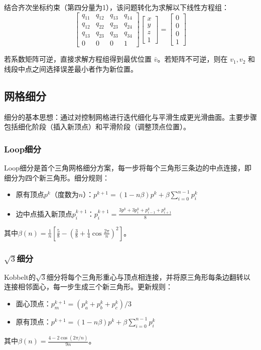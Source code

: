\documentclass[12pt]{article}
\begin{document}
结合齐次坐标约束（第四分量为1），该问题转化为求解以下线性方程组：
\begin{equation}
\begin{bmatrix}
q_{11} & q_{12} & q_{13} & q_{14} \\
q_{12} & q_{22} & q_{23} & q_{24} \\
q_{13} & q_{23} & q_{33} & q_{34} \\
0 & 0 & 0 & 1
\end{bmatrix}
\begin{bmatrix} x \\ y \\ z \\ 1 \end{bmatrix}
=
\begin{bmatrix} 0 \\ 0 \\ 0 \\ 1 \end{bmatrix}
\end{equation}

若系数矩阵可逆，直接求解方程组得到最优位置 $\bar{v}$。若矩阵不可逆，则在 $v_1, v_2$ 和线段中点之间选择误差最小者作为新位置。

\subsection{网格细分}

细分的基本思想：通过对控制网格进行迭代细化与平滑生成更光滑曲面。主要步骤包括细化阶段（插入新顶点）和平滑阶段（调整顶点位置）。

\subsubsection{Loop细分}
Loop细分是首个三角网格细分方案，每一步将每个三角形三条边的中点连接，即细分为四个新三角形。细分规则：
\begin{itemize}
    \item 原有顶点$p^k$（度数为$n$）：$p^{k+1} = (1 - n\beta) p^k + \beta \sum_{i=0}^{n-1} p_i^k$
    \item 边中点插入新顶点$p_i^{k+1}$：$p_i^{k+1} = \frac{3p^k + 3p_i^k + p_{i-1}^k + p_{i+1}^k}{8}$
\end{itemize}
其中$\beta(n) = \frac{1}{n} \left[ \frac{5}{8} - \left( \frac{3}{8} + \frac{1}{4} \cos \frac{2\pi}{n} \right)^2 \right]$。

\subsubsection{$\sqrt{3}$细分}
Kobbelt的$\sqrt{3}$细分将每个三角形重心与顶点相连接，并将原三角形每条边翻转以连接相邻面心，每一步生成三个新三角形。更新规则：
\begin{itemize}
    \item 面心顶点：$p_m^{k+1} = (p_a^k + p_b^k + p_c^k)/3$
    \item 原有顶点：$p^{k+1} = (1 - n\beta) p^k + \beta \sum_{i=0}^{n-1} p_i^k$
\end{itemize}
其中$\beta(n) = \frac{4 - 2\cos(2\pi/n)}{9n}$。
\end{document}
